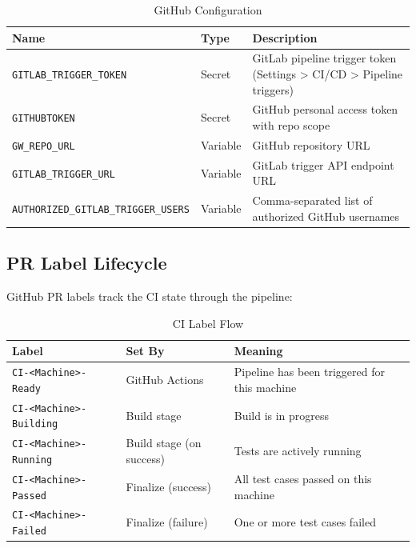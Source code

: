 \documentclass[11pt,letterpaper,twoside]{article}
\begin{document}
\begin{table}[H]
\centering
\caption{GitHub Configuration}
\label{tab:github-config}
\begin{tabularx}{\linewidth}{llX}
\toprule
\textbf{Name} & \textbf{Type} & \textbf{Description} \\
\midrule
\texttt{GITLAB\_TRIGGER\_TOKEN} & Secret & GitLab pipeline trigger token (Settings > CI/CD > Pipeline triggers) \\
\texttt{GITHUBTOKEN} & Secret & GitHub personal access token with repo scope \\
\texttt{GW\_REPO\_URL} & Variable & GitHub repository URL \\
\texttt{GITLAB\_TRIGGER\_URL} & Variable & GitLab trigger API endpoint URL \\
\texttt{AUTHORIZED\_GITLAB\_TRIGGER\_USERS} & Variable & Comma-separated list of authorized GitHub usernames \\
\bottomrule
\end{tabularx}
\end{table}

\subsection{PR Label Lifecycle}
\label{sec:labels}

GitHub PR labels track the CI state through the pipeline:

\begin{table}[H]
\centering
\caption{CI Label Flow}
\label{tab:label-flow}
\begin{tabularx}{\linewidth}{llX}
\toprule
\textbf{Label} & \textbf{Set By} & \textbf{Meaning} \\
\midrule
\texttt{CI-<Machine>-Ready} & GitHub Actions & Pipeline has been triggered for this machine \\
\texttt{CI-<Machine>-Building} & Build stage & Build is in progress \\
\texttt{CI-<Machine>-Running} & Build stage (on success) & Tests are actively running \\
\texttt{CI-<Machine>-Passed} & Finalize (success) & All test cases passed on this machine \\
\texttt{CI-<Machine>-Failed} & Finalize (failure) & One or more test cases failed \\
\bottomrule
\end{tabularx}
\end{table}
\end{document}
